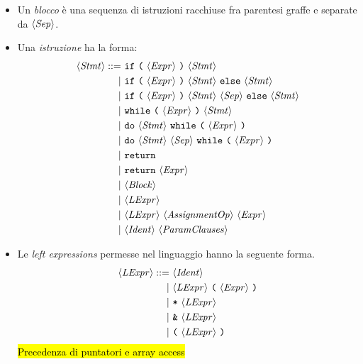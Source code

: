 \begin{itemize}
\begin{itemize}
\end{itemize}

\item Un \emph{blocco} è una sequenza di istruzioni racchiuse fra parentesi graffe e separate da $\langle \mathit{Sep} \rangle$.

\item Una \emph{istruzione} ha la forma:
\begin{align*}
\token{Stmt} ::=\ &\texttt{if}\ \texttt{(}\ \token{Expr}\ \texttt{)}\ \token{Stmt}\\
|\ &\texttt{if}\ \texttt{(}\ \token{Expr}\ \texttt{)}\ \token{Stmt}\ \texttt{else}\ \token{Stmt}\\
|\ &\texttt{if}\ \texttt{(}\ \token{Expr}\ \texttt{)}\ \token{Stmt}\ \token{Sep}\ \texttt{else}\ \token{Stmt}\\
|\ &\texttt{while}\ \texttt{(}\ \token{Expr}\ \texttt{)}\ \token{Stmt}\\
|\ &\texttt{do}\ \token{Stmt}\ \texttt{while}\ \texttt{(}\ \token{Expr}\ \texttt{)}\\
|\ &\texttt{do}\ \token{Stmt}\ \token{Sep}\ \texttt{while}\ \texttt{(}\ \token{Expr}\ \texttt{)}\\
|\ &\texttt{return}\\
|\ &\texttt{return}\ \token{Expr}\\
|\ &\token{Block}\\
|\ &\token{LExpr}\\
|\ &\token{LExpr}\ \token{AssignmentOp}\ \token{Expr}\\
|\ &\token{Ident}\ \token{ParamClauses}
\end{align*}

\item Le \emph{left expressions} permesse nel linguaggio hanno la seguente forma.
\begin{align*}
\langle \mathit{LExpr} \rangle ::=\ &\langle \mathit{Ident} \rangle\\
|\ &\langle \mathit{LExpr} \rangle\ \texttt{(}\ \langle \mathit{Expr} \rangle\ \texttt{)}\\
|\ &\texttt{*}\ \langle \mathit{LExpr} \rangle\\
|\ &\texttt{\&}\ \langle \mathit{LExpr} \rangle\\
|\ &\texttt{(}\ \langle \mathit{LExpr} \rangle\ \texttt{)}
\end{align*}
\hl{Precedenza di puntatori e array access}


\end{itemize}
